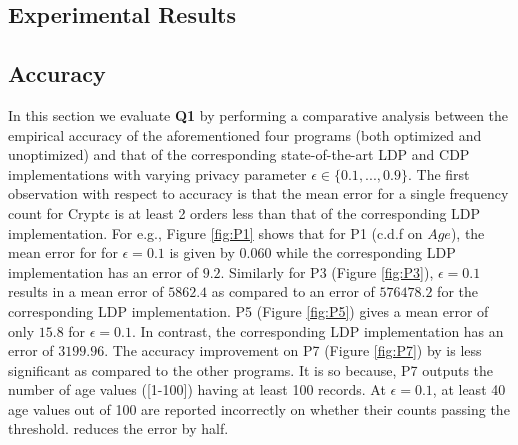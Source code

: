 \subsection{Experimental Results}\label{exp:results}
\subsection*{Accuracy}
In this section we evaluate \textbf{Q1} by performing a comparative analysis between the empirical accuracy of the aforementioned four \system programs (both optimized and unoptimized) and that of the corresponding state-of-the-art \textsf{LDP} \cite{LDP1} and \textsf{CDP} \cite{Dork} implementations  with varying privacy parameter $\epsilon \in \{0.1,...,0.9\}$. %
The first observation with respect to accuracy is that the mean error for a single frequency count for Crypt$\epsilon$ is at least 2 orders less than that of the corresponding \textsf{LDP} implementation.   For e.g., Figure \ref{fig:P1} shows that for P1 (c.d.f on $Age$), the mean error for \system for $\epsilon=0.1$ is given by $0.060$ while the corresponding \textsf{LDP} implementation has an error of $9.2$. Similarly for P3 (Figure \ref{fig:P3}),  $\epsilon=0.1$ results in a mean error of $5862.4$ as compared to an error of $576478.2$ for the corresponding \textsf{LDP} implementation. P5 (Figure \ref{fig:P5}) gives a mean error of only $15.8$ for $\epsilon=0.1$. In contrast, the corresponding \textsf{LDP} implementation has an error of $3199.96$.   The accuracy
improvement on P7 (Figure \ref{fig:P7}) by \system is less significant as compared to the other programs. It is so because, P7 outputs the number of age values ([1-100]) having at least
100 records. At $\epsilon=0.1$, at least 40 age values out of 100 are
reported incorrectly on whether their counts passing the threshold. \system reduces the error by half. 

